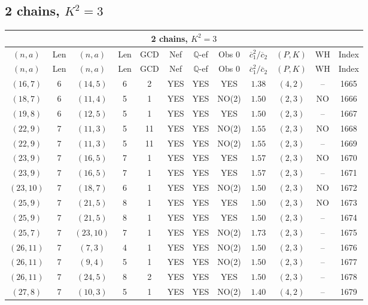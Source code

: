 \subsection{2 chains, $K^2 = 3$}
\begin{longtable}{|c|c|c|c|c|c|c|c|c|c|c|c|}
\hline
\multicolumn{12}{|c|}{2 chains, $K^2 = 3$}\\
\hline
$(n,a)$ & Len & $(n,a)$ & Len & GCD & Nef & $\mathbb Q$-ef & Obs 0 & $\overline c_1^2 / \overline c_2$ & $(P,K)$ & WH & Index\\
\hline
\endfirsthead

\hline
$(n,a)$ & Len & $(n,a)$ & Len & GCD & Nef & $\mathbb Q$-ef & Obs 0 & $\overline c_1^2 / \overline c_2$ & $(P,K)$ & WH & Index\\
\hline
\endhead
\hline
\endfoot

$(16,7)$ & 6 & $(14,5)$ & 6 & 2 & YES & YES & YES & $1.38$ & $(4,2)$ & -- & 1665\\
$(18,7)$ & 6 & $(11,4)$ & 5 & 1 & YES & YES & NO(2) & $1.50$ & $(2,3)$ & NO & 1666\\
$(19,8)$ & 6 & $(12,5)$ & 5 & 1 & YES & YES & YES & $1.50$ & $(2,3)$ & -- & 1667\\
$(22,9)$ & 7 & $(11,3)$ & 5 & 11 & YES & YES & NO(2) & $1.55$ & $(2,3)$ & NO & 1668\\
$(22,9)$ & 7 & $(11,3)$ & 5 & 11 & YES & YES & NO(2) & $1.55$ & $(2,3)$ & -- & 1669\\
$(23,9)$ & 7 & $(16,5)$ & 7 & 1 & YES & YES & YES & $1.57$ & $(2,3)$ & NO & 1670\\
$(23,9)$ & 7 & $(16,5)$ & 7 & 1 & YES & YES & YES & $1.57$ & $(2,3)$ & -- & 1671\\
$(23,10)$ & 7 & $(18,7)$ & 6 & 1 & YES & YES & NO(2) & $1.50$ & $(2,3)$ & NO & 1672\\
$(25,9)$ & 7 & $(21,5)$ & 8 & 1 & YES & YES & YES & $1.50$ & $(2,3)$ & NO & 1673\\
$(25,9)$ & 7 & $(21,5)$ & 8 & 1 & YES & YES & YES & $1.50$ & $(2,3)$ & -- & 1674\\
$(25,7)$ & 7 & $(23,10)$ & 7 & 1 & YES & YES & NO(2) & $1.73$ & $(2,3)$ & -- & 1675\\
$(26,11)$ & 7 & $(7,3)$ & 4 & 1 & YES & YES & NO(2) & $1.50$ & $(2,3)$ & -- & 1676\\
$(26,11)$ & 7 & $(9,4)$ & 5 & 1 & YES & YES & NO(2) & $1.50$ & $(2,3)$ & -- & 1677\\
$(26,11)$ & 7 & $(24,5)$ & 8 & 2 & YES & YES & YES & $1.50$ & $(2,3)$ & -- & 1678\\
$(27,8)$ & 7 & $(10,3)$ & 5 & 1 & YES & YES & NO(2) & $1.40$ & $(4,2)$ & -- & 1679\\

\end{longtable}
